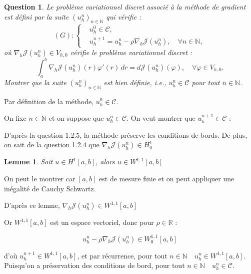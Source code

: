 \documentclass{article}
\newcommand{\Integer}{ \mathbb{N} }
\newcommand{\Real}{ \mathbb{R} }
\newcommand{\Integral}[4]{ \int_{#1}^{#2} #3 \, d#4 }
\newtheorem{question}{Question}[subsection]
\newenvironment{answer}
  {\color{blue}}
  {}
\newcommand{\QuestionAnswer}[2]{
    \begin{question}
        #1
    \end{question}
    \begin{answer}
        #2
    \end{answer}
}
\newtheorem{lemma}{Lemme}
\newcommand{\SetC}{\mathcal{C}}
\newcommand{\FunctionJ}{\mathcal{J}}
\begin{document}
\QuestionAnswer{
    Le problème variationnel discret associé à la méthode de gradient est défini par la suite $(u^n_h)_{n\in\Integer}$ qui vérifie :
    \begin{equation*}
    (G): \left\{
    \begin{aligned}
        & u^0_h \in \SetC, \\
        & u^{n+1}_h = u^n_h - \rho\nabla_h\mathcal{J}(u^n_h), \quad \forall n \in \Integer,
    \end{aligned}
    \right.
    \end{equation*}
    où $\nabla_h\FunctionJ(u^n_h) \in V_{h,0}$ vérifie le problème variationnel discret :
    $$\Integral{a}{b}{ \nabla_h\FunctionJ(u^n_h)(r)\varphi'(r) }{r} = d\FunctionJ(u^n_h)(\varphi), \quad \forall \varphi \in V_{h,0}.$$
    Montrer que la suite $(u^n_h)_{n\in\Integer}$ est bien définie, i.e., $u^n_h \in \SetC$ pour tout $n \in \Integer$.
}{
    Par définition de la méthode, $u^0_h \in \SetC$.

    On fixe $n \in \Integer$ et on suppose que $u^n_h \in \SetC$. On veut montrer que $u^{n+1}_h \in \SetC$ :

    D'après la question 1.2.5, la méthode préserve les conditions de bords. De plus, on sait de la question 1.2.4 que $\nabla_h\mathcal{J}(u^n_h) \in H^1_0$

    \begin{lemma}
        Soit $u \in H^1[a,b]$, alors $u \in W^{1,1}[a,b]$
    \end{lemma}
    On peut le montrer car $[a,b]$ est de mesure finie et on peut appliquer une inégalité de Cauchy Schwartz.\newline

    D'après ce lemme, $\nabla_h\mathcal{J}(u^n_h) \in W^{1,1}[a,b]$

    Or $W^{1,1}[a,b]$ est un espace vectoriel, donc pour $\rho \in \Real$ :

    $$u^n_h - \rho\nabla_h\mathcal{J}(u^n_h) \in W^{1,1}_0[a,b]$$

    d'où $u^{n+1}_h \in W^{1,1}[a,b]$, et par récurrence, pour tout $n \in \Integer \quad u^{n}_h \in W^{1,1}[a,b]$.
    Puisqu'on a préservation des conditions de bord, pour tout $n \in \Integer \quad u^{n}_h \in \SetC$.
    
}
\end{document}
